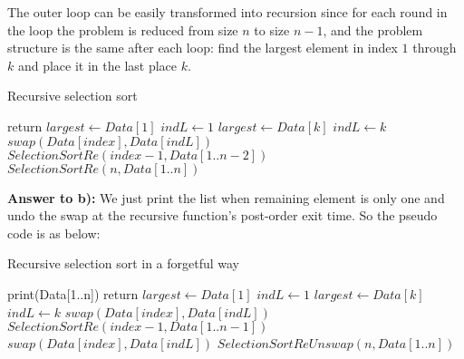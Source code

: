 \documentclass[a4paper,11pt]{article}
\theoremstyle{mytheor}
\begin{document}
The outer loop can be easily transformed into recursion since for each round in the loop the problem is reduced from size $n$ to size $n-1$, and the problem structure is the same after each loop: find the largest element in index $1$ through $k$ and place it in the last place $k$.

\begin{algorithm}[H]
\caption{Recursive selection sort}\label{sec:TREEEVALUATION_2_23_a}
\begin{algorithmic}[1]
    \State return
  \EndIf
  \State $largest \gets Data[1]$
  \State $indL \gets 1$
      \State $largest \gets Data[k]$
      \State $indL \gets k$
    \EndIf
  \EndFor
  \State $swap(Data[index], Data[indL])$
  \State $SelectionSortRe(index - 1, Data[1..n-2])$
\EndProcedure
\State
{}
  \State $SelectionSortRe(n, Data[1..n])$
\EndProcedure
\end{algorithmic}
\end{algorithm}

\vspace{1.2in}

\noindent\textbf{Answer to b):} We just print the list when remaining element is only one and undo the swap at the recursive function's post-order exit time. So the pseudo code is as below:

\begin{algorithm}[H]
\caption{Recursive selection sort in a forgetful way}\label{sec:TREEEVALUATION_2_23_b}
\begin{algorithmic}[1]
    \State print(Data[1..n])  
    \State return
  \EndIf
  \State $largest \gets Data[1]$
  \State $indL \gets 1$
      \State $largest \gets Data[k]$
      \State $indL \gets k$
    \EndIf
  \EndFor
  \State $swap(Data[index], Data[indL])$
  \State $SelectionSortRe(index - 1, Data[1..n-1])$
  \State $swap(Data[index], Data[indL])$ 
\EndProcedure
\State
{}
  \State $SelectionSortReUnswap(n, Data[1..n])$
\EndProcedure
\end{algorithmic}
\end{algorithm}

\vspace{1.2in}
\end{document}
